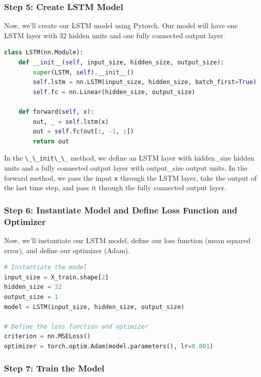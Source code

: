 \subsubsection{Step 5: Create LSTM
Model}\label{step-5-create-lstm-model}

Now, we'll create our LSTM model using Pytorch. Our model will have one
LSTM layer with 32 hidden units and one fully connected output layer.

\begin{lstlisting}[language=Python]
class LSTM(nn.Module):
    def __init__(self, input_size, hidden_size, output_size):
        super(LSTM, self).__init__()
        self.lstm = nn.LSTM(input_size, hidden_size, batch_first=True)
        self.fc = nn.Linear(hidden_size, output_size)

    def forward(self, x):
        out, _ = self.lstm(x)
        out = self.fc(out[:, -1, :])
        return out
\end{lstlisting}

In the \lstinline{\_\_init\_\_} method, we define an LSTM
layer with hidden\_size hidden units and a fully connected output layer
with output\_size output units. In the forward method, we pass the input
\lstinline{x} through the LSTM layer, take the output of
the last time step, and pass it through the fully connected output
layer.

\subsubsection{Step 6: Instantiate Model and Define Loss Function and
Optimizer}\label{step-6-instantiate-model-and-define-loss-function-and-optimizer}

Now, we'll instantiate our LSTM model, define our loss function (mean
squared error), and define our optimizer (Adam).

\begin{lstlisting}[language=Python]
# Instantiate the model
input_size = X_train.shape[2]
hidden_size = 32
output_size = 1
model = LSTM(input_size, hidden_size, output_size)

# Define the loss function and optimizer
criterion = nn.MSELoss()
optimizer = torch.optim.Adam(model.parameters(), lr=0.001)
\end{lstlisting}

\subsubsection{Step 7: Train the Model}\label{step-7-train-the-model}

